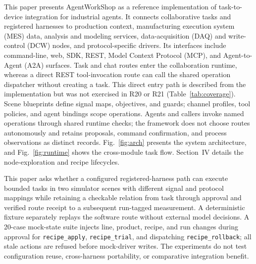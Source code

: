 This paper presents AgentWorkShop as a reference implementation of
task-to-device integration for industrial agents. It connects collaborative tasks
and registered harnesses to production context, manufacturing execution
system (MES) data, analysis and modeling services, data-acquisition (DAQ) and
write-control (DCW) nodes, and protocol-specific drivers. Its interfaces include
command-line, web, SDK, REST, Model Context Protocol (MCP), and Agent-to-Agent
(A2A) surfaces. Task and chat routes enter the
collaboration runtime, whereas a direct REST tool-invocation route can call
the shared operation dispatcher without creating a task. This direct entry
path is described from the implementation but was not exercised in R20 or
R21 (Table~\ref{tab:coverage}).
Scene blueprints define signal maps, objectives, and guards; channel profiles,
tool policies, and agent bindings scope operations. Agents and callers invoke
named operations through shared runtime checks; the framework does not choose
routes autonomously and retains proposals, command confirmation, and process
observations as distinct records. Fig.~\ref{fig:arch} presents the system
architecture, and Fig.~\ref{fig:runtime} shows the cross-module task flow.
Section~IV details the node-exploration and recipe lifecycles.

This paper asks whether a configured registered-harness path can execute
bounded tasks in two simulator scenes with different signal and protocol
mappings while retaining a checkable relation from task through approval and
verified route receipt to a subsequent run-tagged measurement. A deterministic
fixture separately replays the software route without external model
decisions. A 20-case mock-state suite injects line, product, recipe, and run
changes during approval for \texttt{recipe\_apply}, \texttt{recipe\_trial},
and dispatching \texttt{recipe\_rollback}; all stale actions are refused
before mock-driver writes. The experiments do not test configuration reuse,
cross-harness portability, or comparative integration benefit.

